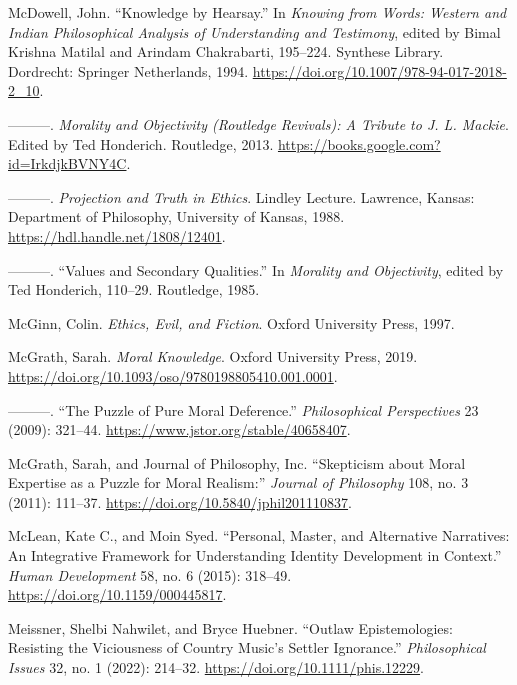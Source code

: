 \documentclass[phdthesis,12pt,final]{wuthesis}
\newlength{\cslhangindent}
\newenvironment{CSLReferences}[2] %
{\begin{list}{}{%
	\setlength{\itemindent}{0pt}
	\setlength{\leftmargin}{0pt}
	\setlength{\parsep}{0pt}
	\ifodd #1
	\setlength{\leftmargin}{\cslhangindent}
	\setlength{\itemindent}{-1\cslhangindent}
	\fi
	\setlength{\itemsep}{#2\baselineskip}}}
{\end{list}}
\theoremstyle{definition}
\theoremstyle{definition}
\theoremstyle{definition}
\theoremstyle{definition}
\theoremstyle{remark}
\begin{document}
\begin{CSLReferences}{1}{0}
McDowell, John. {``Knowledge by {Hearsay}.''} In \emph{Knowing from {Words}: {Western} and {Indian Philosophical Analysis} of {Understanding} and {Testimony}}, edited by Bimal Krishna Matilal and Arindam Chakrabarti, 195--224. Synthese {Library}. Dordrecht: Springer Netherlands, 1994. \url{https://doi.org/10.1007/978-94-017-2018-2_10}.

---------. \emph{Morality and {Objectivity} ({Routledge Revivals}): {A Tribute} to {J}. {L}. {Mackie}}. Edited by Ted Honderich. Routledge, 2013. \url{https://books.google.com?id=IrkdjkBVNY4C}.

---------. \emph{Projection and {Truth} in {Ethics}}. Lindley Lecture. Lawrence, Kansas: Department of Philosophy, University of Kansas, 1988. \url{https://hdl.handle.net/1808/12401}.

---------. {``Values and {Secondary Qualities}.''} In \emph{Morality and {Objectivity}}, edited by Ted Honderich, 110--29. Routledge, 1985.

McGinn, Colin. \emph{Ethics, {Evil}, and {Fiction}}. Oxford University Press, 1997.

McGrath, Sarah. \emph{Moral {Knowledge}}. Oxford University Press, 2019. \url{https://doi.org/10.1093/oso/9780198805410.001.0001}.

---------. {``The {Puzzle} of {Pure Moral Deference}.''} \emph{Philosophical Perspectives} 23 (2009): 321--44. \url{https://www.jstor.org/stable/40658407}.

McGrath, Sarah, and Journal of Philosophy, Inc. {``Skepticism about {Moral Expertise} as a {Puzzle} for {Moral Realism}:''} \emph{Journal of Philosophy} 108, no. 3 (2011): 111--37. \url{https://doi.org/10.5840/jphil201110837}.

McLean, Kate C., and Moin Syed. {``Personal, {Master}, and {Alternative Narratives}: {An Integrative Framework} for {Understanding Identity Development} in {Context}.''} \emph{Human Development} 58, no. 6 (2015): 318--49. \url{https://doi.org/10.1159/000445817}.

Meissner, Shelbi Nahwilet, and Bryce Huebner. {``Outlaw Epistemologies: {Resisting} the Viciousness of Country Music's Settler Ignorance.''} \emph{Philosophical Issues} 32, no. 1 (2022): 214--32. \url{https://doi.org/10.1111/phis.12229}.


\end{CSLReferences}
\end{document}
